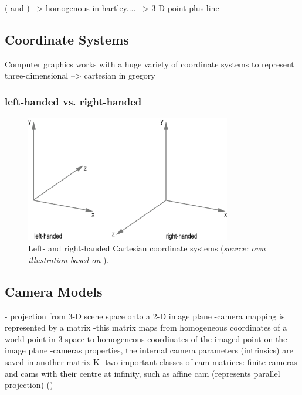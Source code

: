 (\cite[p.30]{Szeliski.2011} and \cite[p.2]{Hartley.2011}) 
--> homogenous in hartley....
--> 3-D point plus line

\subsection{Coordinate Systems}
Computer graphics works with a huge variety of coordinate systems to represent three-dimensional  
--> cartesian in gregory

\subsubsection{left-handed vs. right-handed}

\begin{figure}[htbp]
		\centering
		\includegraphics[width=0.8\textwidth]{figures/CoordinateSystems}
		\caption[Left- and right-handed Cartesian coordinate systems]{Left- and right-handed Cartesian coordinate systems (\textit{source: own illustration based on} \cite[p.167]{Gregory.2014}).}
		\label{fig:CoordinateSys}
\end{figure}

\subsection{Camera Models}
- projection from 3-D scene space onto a 2-D image plane
-camera mapping is represented by a matrix
-this matrix maps from homogeneous coordinates of a world point in 3-space to homogeneous coordinates of the imaged point on the image plane
-cameras properties, the internal camera parameters (intrinsics) are saved in another matrix K
-two important classes of cam matrices: finite cameras and cams with their centre at infinity, such as affine cam (represents parallel projection)
 (\cite[p.152]{Hartley.2011})
 
